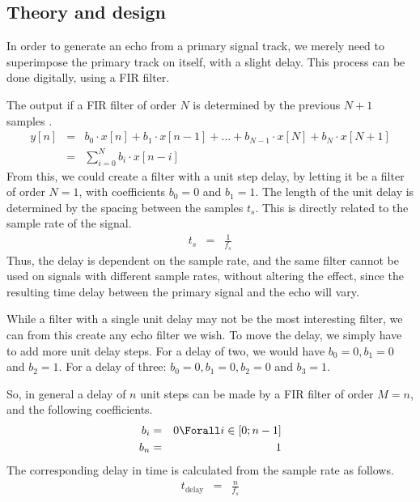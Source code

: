 
\subsection{Theory and design}
In order to generate an echo from a primary signal track, we merely need to superimpose the primary track on itself, with a slight delay. This process can be done digitally, using a FIR filter.

The output if a FIR filter of order $N$ is determined by the previous $N + 1$ samples .
\begin{eqnarray}
y[n] & = & b_{0} \cdot x[n] + b_{1} \cdot x[n - 1] + \dots + b_{N - 1} \cdot x[N] + b_{N} \cdot x[N + 1] \nonumber \\
& = & \sum_{i = 0}^{N} b_{i} \cdot x[n - i]
\end{eqnarray}
From this, we could create a filter with a unit step delay, by letting it be a filter of order $N = 1$, with coefficients $b_{0} = 0$ and $b_{1} = 1$. The length of the unit delay is determined by the spacing between the samples $t_{s}$. This is directly related to the sample rate of the signal.
\begin{eqnarray}
t_{s} & = & \frac{1}{f_{s}}
\end{eqnarray}
Thus, the delay is dependent on the sample rate, and the same filter cannot be used on signals with different sample rates, without altering the effect, since the resulting time delay between the primary signal and the echo will vary.

While a filter with a single unit delay may not be the most interesting filter, we can from this create any echo filter we wish. To move the delay, we simply have to add more unit delay steps. For a delay of two, we would have $b_{0} = 0, b_{1} = 0$ and $b_{2} = 1$. For a delay of three: $b_{0} = 0, b_{1} = 0, b_{2} = 0$ and $b_{3} = 1$.

So, in general a delay of $n$ unit steps can be made by a FIR filter of order $M = n$, and the following coefficients.
\begin{eqnarray}
b_{i} & = & 0 \Forall i \in [0; n - 1] \nonumber \\
b_{n} & = & 1
\end{eqnarray}
The corresponding delay in time is calculated from the sample rate as follows.
\begin{eqnarray}
t_{\textrm{delay}} & = & \frac{n}{f_{s}}
\end{eqnarray}